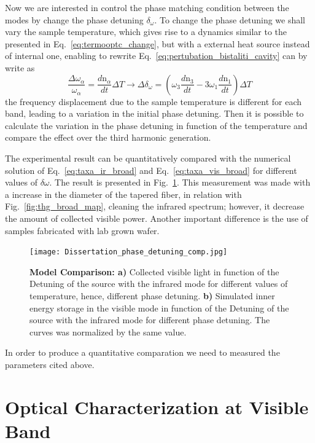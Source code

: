 Now we are interested in control the phase matching condition between the modes by change the phase detuning $\delta_\omega$. To change the phase detuning we shall vary the sample temperature, which gives rise to a dynamics similar to the presented in Eq.~\ref{eq:termooptc_change}, but with a external heat source instead of internal one, enabling to rewrite Eq.~\ref{eq:pertubation_bistaliti_cavity} can by write as 
\begin{equation}
    \frac{\Delta\omega_\alpha}{\omega_\alpha} = \frac{d\text{n}_\alpha}{dt}\Delta T \rightarrow \Delta\delta_\omega = \left(\omega_3\frac{d\text{n}_3}{dt} - 3\omega_1\frac{d\text{n}_1}{dt}\right)\Delta T
    \label{eq:temperature_mode_variation}
\end{equation}
the frequency displacement due to the sample temperature is different for each band, leading to a variation in the initial phase detuning. Then it is possible to calculate the variation in the phase detuning in function of the temperature and compare the effect over the third harmonic generation. 

The experimental result can be quantitatively compared with the numerical solution of Eq.~\ref{eq:taxa_ir_broad} and Eq.~\ref{eq:taxa_vis_broad} for different values of $\delta\omega$. The result is presented in Fig.~\ref{fig:thg_control_phase_det}. This measurement was made with a increase in the diameter of the tapered fiber, in relation with Fig.~\ref{fig:thg_broad_map}, cleaning the infrared spectrum; however, it decrease the amount of collected visible power. Another important difference is the use of samples fabricated with lab grown wafer.
\begin{figure}[!h]
    \centering
    \texttt{[image: Dissertation\_phase\_detuning\_comp.jpg]}
    \caption{\textbf{Model Comparison: a)} Collected visible light in function of the Detuning of the source with the infrared mode for different values of temperature, hence, different phase detuning. \textbf{b)} Simulated inner energy storage in the visible mode in function of the Detuning of the source with the infrared mode for different phase detuning. The curves was normalized by the same value.}
    \label{fig:thg_control_phase_det}
\end{figure}

In order to produce a quantitative comparation we need to measured the parameters cited above.  

\section{Optical Characterization at Visible Band}

